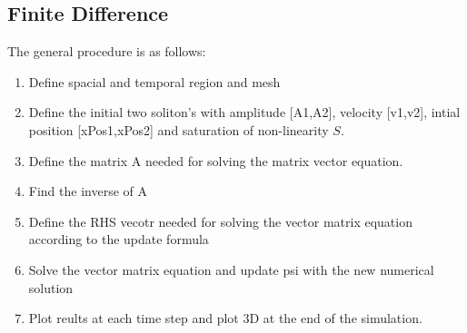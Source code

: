 \documentclass{article}
\begin{document}
\subsection{Finite Difference}
The general procedure is as follows:
\begin{enumerate}
\item Define spacial and temporal region and mesh
\item Define the initial two soliton's with amplitude [A1,A2], velocity [v1,v2], intial position [xPos1,xPos2] and saturation of non-linearity $S$.
\item Define the matrix A needed for solving the matrix vector equation. 
\item Find the inverse of A
\item Define the RHS vecotr needed for solving the vector matrix equation according to the update formula
\item Solve the vector matrix equation and update psi with the new numerical solution
\item Plot reults at each time step and plot 3D at the end of the simulation. 
\end{enumerate}
\end{document}
